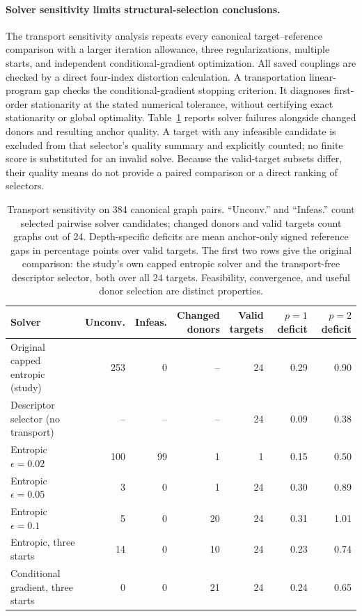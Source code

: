 \paragraph{Solver sensitivity limits structural-selection conclusions.}
The transport sensitivity analysis repeats every canonical target--reference comparison with a larger iteration allowance, three regularizations, multiple starts, and independent conditional-gradient optimization. All saved couplings are checked by a direct four-index distortion calculation. A transportation linear-program gap checks the conditional-gradient stopping criterion. It diagnoses first-order stationarity at the stated numerical tolerance, without certifying exact stationarity or global optimality. Table~\ref{tab:transport} reports solver failures alongside changed donors and resulting anchor quality. A target with any infeasible candidate is excluded from that selector's quality summary and explicitly counted; no finite score is substituted for an invalid solve.
Because the valid-target subsets differ, their quality means do not provide a paired comparison or a direct ranking of selectors.
\begin{table}[t]
\caption{Transport sensitivity on 384 canonical graph pairs. ``Unconv.'' and ``Infeas.'' count selected pairwise solver candidates; changed donors and valid targets count graphs out of 24. Depth-specific deficits are mean anchor-only signed reference gaps in percentage points over valid targets. The first two rows give the original comparison: the study's own capped entropic solver and the transport-free descriptor selector, both over all 24 targets. Feasibility, convergence, and useful donor selection are distinct properties.}\label{tab:transport}
\centering\scriptsize\setlength{\tabcolsep}{3pt}
\begin{tabular}{lrrrrrr}
\toprule
Solver & Unconv. & Infeas. & \shortstack{Changed\\donors} & \shortstack{Valid\\targets} & \shortstack{$p=1$\\deficit} & \shortstack{$p=2$\\deficit} \\
\midrule
Original capped entropic (study) & 253 & 0 & -- & 24 & 0.29 & 0.90 \\
Descriptor selector (no transport) & -- & -- & -- & 24 & 0.09 & 0.38 \\
\midrule
Entropic $\epsilon=0.02$ & 100 & 99 & 1 & 1 & 0.15 & 0.50 \\
Entropic $\epsilon=0.05$ & 3 & 0 & 1 & 24 & 0.30 & 0.89 \\
Entropic $\epsilon=0.1$ & 5 & 0 & 20 & 24 & 0.31 & 1.01 \\
Entropic, three starts & 14 & 0 & 10 & 24 & 0.23 & 0.74 \\
Conditional gradient, three starts & 0 & 0 & 21 & 24 & 0.24 & 0.65 \\
\bottomrule
\end{tabular}
\end{table}
